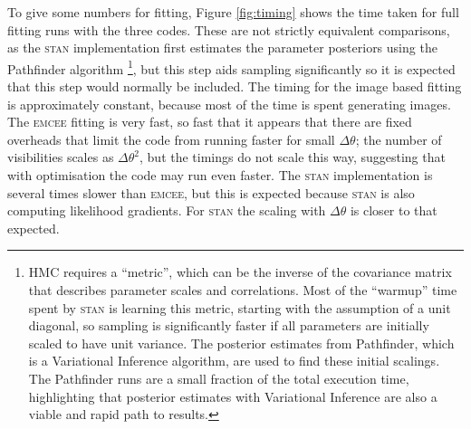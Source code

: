 \documentclass[fleqn,usenatbib]{rasti}
\begin{document}
To give some numbers for fitting, Figure \ref{fig:timing} shows the time taken for full fitting runs with the three codes. These are not strictly equivalent comparisons, as the \textsc{stan} implementation first estimates the parameter posteriors using the Pathfinder algorithm \citep{JMLR:v23:21-0889}\footnote{HMC requires a ``metric'', which can be the inverse of the covariance matrix that describes parameter scales and correlations. Most of the ``warmup'' time spent by \textsc{stan} is learning this metric, starting with the assumption of a unit diagonal, so sampling is significantly faster if all parameters are initially scaled to have unit variance. The posterior estimates from Pathfinder, which is a Variational Inference algorithm, are used to find these initial scalings. The Pathfinder runs are a small fraction of the total execution time, highlighting that posterior estimates with Variational Inference are also a viable and rapid path to results.}, but this step aids sampling significantly so it is expected that this step would normally be included. The timing for the image based fitting is approximately constant, because most of the time is spent generating images. The \textsc{emcee} fitting is very fast, so fast that it appears that there are fixed overheads that limit the code from running faster for small $\Delta \theta$; the number of visibilities scales as $\Delta \theta^2$, but the timings do not scale this way, suggesting that with optimisation the code may run even faster. The \textsc{stan} implementation is several times slower than \textsc{emcee}, but this is expected because \textsc{stan} is also computing likelihood gradients. For \textsc{stan} the scaling with $\Delta \theta$ is closer to that expected.

\end{document}
